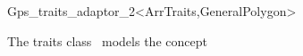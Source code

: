 \ccRefPageBegin

\begin{ccRefClass}{Gps_traits_adaptor_2<ArrTraits,GeneralPolygon>}

\ccThreeToTwo

\ccDefinition
The traits class \ccRefName\ models the 
concept

 
\ccIsModel

\end{ccRefClass}
\ccRefPageEnd
